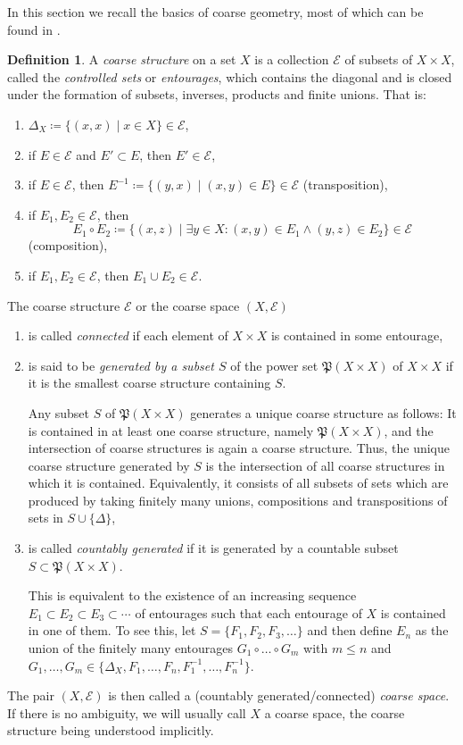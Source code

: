 \documentclass[pdftex]{sigma}
\numberwithin{equation}{section}
\theoremstyle{definition}
\newtheorem{defn}[thm]{Definition}
\newcommand{\fP}{\mathfrak{P}}
\newcommand{\coarseStr}{\mathcal{E}}
\newcommand{\Diag}[1][]{{\Delta_{#1}}}
\begin{document}
In this section we recall the basics of coarse geometry, most of which can be found in \cite{RoeCoarseGeometry}.
\begin{defn}\label{def:coarsestructure}
A \emph{coarse structure} on a set $X$ is a collection $\coarseStr$ of subsets of $X\times X$, called the \emph{controlled sets} or \emph{entourages}, which contains the diagonal and is closed under the formation of subsets, inverses, products and finite unions. That is:
\begin{enumerate}\itemsep=0pt
\item[$1)$] $\Diag[X]\coloneqq\{(x,x)\mid x\in X\}\in\coarseStr$,
\item[$2)$] if $E\in\coarseStr$ and $E'\subset E$, then $E'\in\coarseStr$,
\item[$3)$] if $E\in\coarseStr$, then $E^{-1}\coloneqq\{(y,x)\mid(x,y)\in E\}\in\coarseStr$ (transposition),
\item[$4)$] if $E_1,E_2\in\coarseStr$, then
\[
E_1\circ E_2\coloneqq\{(x,z)\mid\exists y\in X\colon (x,y)\in E_1\wedge (y,z)\in E_2\}\in \coarseStr
\]
(composition),
\item[$5)$] if $E_1,E_2\in\coarseStr$, then $E_1\cup E_2\in\coarseStr$.
\end{enumerate}
The coarse structure $\coarseStr$ or the coarse space $(X,\coarseStr)$
\begin{enumerate}\itemsep=0pt
\item[$\bullet$] is called \emph{connected} if each element of $X\times X$ is contained in some entourage,
\item[$\bullet$] is said to be \emph{generated by a subset $S$} of the power set $\fP(X\times X)$ of $X\times X$ if it is the smallest coarse structure containing $S$.

Any subset $S$ of $\fP(X\times X)$ generates a unique coarse structure as follows: It is contained in at least one coarse structure, namely $\fP(X\times X)$, and the intersection of coarse structures is again a coarse structure. Thus, the unique coarse structure generated by $S$ is the intersection of all coarse structures in which it is contained.
Equivalently, it consists of all subsets of sets which are produced by taking finitely many unions, compositions and transpositions of sets in $S\cup\{\Delta\}$,

\item[$\bullet$] is called \emph{countably generated} if it is generated by a countable subset $S\subset\fP(X\times X)$.

This is equivalent to the existence of an increasing sequence $E_1\subset E_2\subset E_3\subset\cdots$ of entourages such that each entourage of $X$ is contained in one of them. To see this, let $S=\{F_1,F_2,F_3,\dots\}$ and then define $E_n$ as the union of the finitely many entourages $G_1\circ \dots\circ G_m$ with $m\leq n$ and $G_1,\dots,G_m\in\big\{\Delta_X,F_1,\dots, F_n,F_1^{-1},\dots,F_n^{-1}\big\}$.
\end{enumerate}
The pair $(X,\coarseStr)$ is then called a (countably generated/connected) \emph{coarse space}.
If there is no ambiguity, we will usually call $X$ a coarse space, the coarse structure being understood implicitly.


\end{defn}
\end{document}
